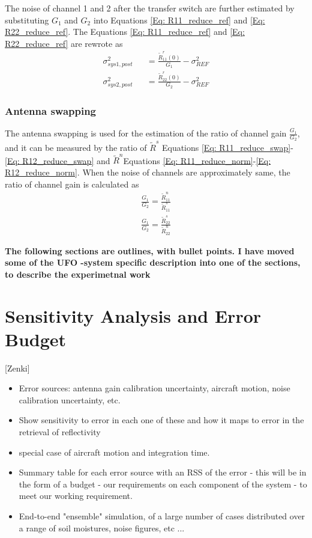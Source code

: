 \documentclass[draftcls,onecolumn]{IEEEtran}  %
\begin{document}
The noise of channel 1 and 2 after the transfer switch are further estimated by substituting $G_1$ and $G_2$ into Equations \ref{Eq: R11_reduce_ref} and \ref{Eq: R22_reduce_ref}. The Equations \ref{Eq: R11_reduce_ref} and \ref{Eq: R22_reduce_ref} are rewrote as
\begin{eqnarray}
	\sigma^2_{sys1,post} &&= \frac{\tilde{R}^r_{11}(0) }{G_1}-\sigma^2_{REF}  \label{Eq: Cal_channel_noise1} \\
    \sigma^2_{sys2,post} &&= \frac{\tilde{R}^r_{22}(0) }{G_2}-\sigma^2_{REF}  \label{Eq: Cal_channel_noise2} 
\end{eqnarray}

\subsubsection{Antenna swapping}
The antenna swapping \cite{Alejandro:2013} is used for the estimation of the ratio of channel gain $\frac{G_1}{G_2}$, and it can be measured by the ratio of $\tilde{R}^s$ Equations \ref{Eq: R11_reduce_swap}-\ref{Eq: R12_reduce_swap} and $\tilde{R}^n$Equations \ref{Eq: R11_reduce_norm}-\ref{Eq: R12_reduce_norm}. When the noise of channels are approximately same, the ratio of channel gain is calculated as
\begin{eqnarray}
	\frac{G_1}{G_2} = \frac{\tilde{R}^n_{11}}{\tilde{R}^s_{11}} \\
    \frac{G_1}{G_2} = \frac{\tilde{R}^s_{22}}{\tilde{R}^n_{22}}  \label{Eq: Cal_channel_gain_ratio}
\end{eqnarray}


\bf The following sections are outlines, with bullet points.  I have moved some of the UFO -system specific description into one of the sections, to describe the experimetnal work \rm


   
\section{Sensitivity Analysis and Error Budget}

[Zenki]
\label{sec:error}
   \begin{itemize}
     \item Error sources: antenna gain calibration uncertainty, aircraft motion, noise calibration uncertainty, etc.
     \item Show sensitivity to error in each one of these and how it maps to error in the retrieval of reflectivity
     \item special case of aircraft motion and integration time.
     \item Summary table for each error source with an RSS of the error - this will be in the form of a budget - our requirements on each component of the system - to meet our working requirement.
     \item End-to-end "ensemble" simulation, of a large number of cases distributed over a range of soil moistures, noise figures, etc ...
   \end{itemize}
   
\end{document}
